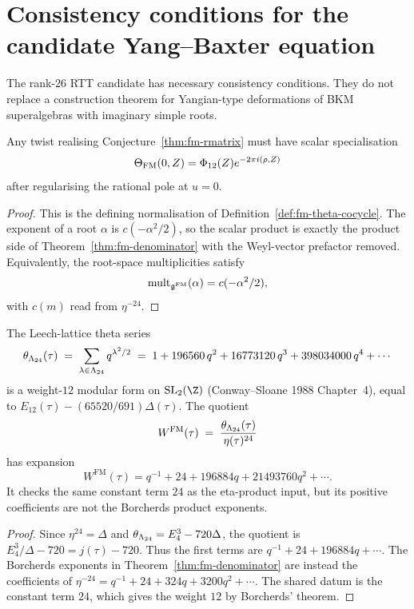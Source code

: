 \section{Consistency conditions for the candidate Yang--Baxter equation}
\label{sec:fm-three-paths}

The rank-$26$ RTT candidate has necessary consistency conditions. They
do not replace a construction theorem for Yangian-type deformations of
BKM superalgebras with imaginary simple roots.

\begin{proposition}
\label{ver:fm-path-i}
Any twist realising Conjecture~\ref{thm:fm-rmatrix} must have scalar
specialisation
\[
 \Theta_{\mathrm{FM}}(0,Z)=\Phi_{12}(Z)e^{-2\pi i(\rho,Z)}
\]
after regularising the rational pole at $u=0$.
\end{proposition}

\begin{proof}
This is the defining normalisation of Definition~\ref{def:fm-theta-cocycle}.
The exponent of a root $\alpha$ is $c(-\alpha^2/2)$, so the scalar
product is exactly the product side of Theorem~\ref{thm:fm-denominator}
with the Weyl-vector prefactor removed. Equivalently, the root-space
multiplicities satisfy
\[
 \mathrm{mult}_{\mathfrak{g}^{\mathrm{FM}}}(\alpha)=c(-\alpha^2/2),
\]
with $c(m)$ read from $\eta^{-24}$.
\end{proof}

\begin{proposition}
\label{ver:fm-path-ii}
The Leech-lattice theta series
\[
 \theta_{\Lambda_{24}}(\tau) \;=\; \sum_{\lambda\in\Lambda_{24}} q^{\lambda^2/2} \;=\; 1 + 196560\, q^2 + 16773120\, q^3 + 398034000\, q^4 + \cdots
\]
is a weight-$12$ modular form on $\mathrm{SL}_2(\Z)$ (Conway--Sloane 1988 Chapter~4), equal to $E_{12}(\tau) - (65520/691)\Delta(\tau)$. The quotient
\[
 W^{\mathrm{FM}}(\tau) \;=\; \frac{\theta_{\Lambda_{24}}(\tau)}{\eta(\tau)^{24}}
\]
has expansion
\[
 W^{\mathrm{FM}}(\tau)=q^{-1}+24+196884q+21493760q^2+\cdots.
\]
It checks the same constant term $24$ as the eta-product input, but its
positive coefficients are not the Borcherds product exponents.
\end{proposition}

\begin{proof}
Since $\eta^{24}=\Delta$ and
$\theta_{\Lambda_{24}}=E_4^3-720\Delta$, the quotient is
$E_4^3/\Delta-720=j(\tau)-720$. Thus the first terms are
$q^{-1}+24+196884q+\cdots$. The Borcherds exponents in
Theorem~\ref{thm:fm-denominator} are instead the coefficients of
$\eta^{-24}=q^{-1}+24+324q+3200q^2+\cdots$. The shared datum is the
constant term $24$, which gives the weight $12$ by Borcherds' theorem.
\end{proof}

